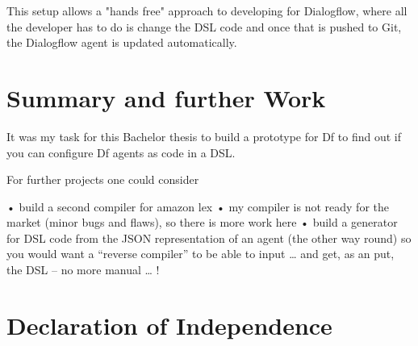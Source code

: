 This setup allows a "hands free" approach to developing for Dialogflow, where all the developer has to do is change the DSL code and once that is pushed to Git, the Dialogflow agent is updated automatically.


\chapter{Summary and further Work}

It was my task for this Bachelor thesis to build a prototype for Df to find out if you can configure Df agents as code in a DSL.

For further projects one could consider

•	build a second compiler for amazon lex
•	my compiler is not ready for the market (minor bugs and flaws), so there is more work here 
•	build a generator for DSL code from the JSON representation of an agent (the other way round) so you would want a “reverse compiler” to be able to input … and get, as an put, the DSL – no more manual … ! 

\chapter{Declaration of Independence}